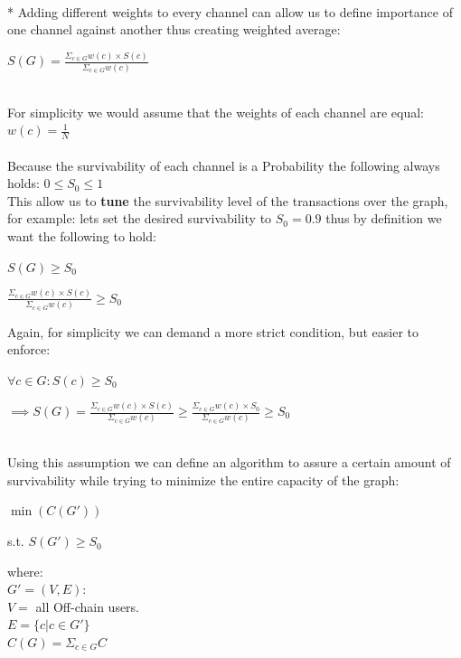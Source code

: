 \documentclass{cup-ino}
\begin{document}
\\
* Adding different weights to every channel can allow us to define importance of one channel against another thus creating weighted average:
\begin{center}
    $S(G) = \frac{\Sigma_{c \in G} w(c) \times S(c)}{\Sigma_{c \in G} w(c)}$
\end{center}
\\
For simplicity we would assume that the weights of each channel are equal: $w(c) = \frac{1}{N}$
\\\\
Because the survivability of each channel is a Probability the following always holds: $0 \leq S_0 \leq 1$\\
This allow us to \textbf{tune} the survivability level of the transactions over the graph, for example: lets set the desired survivability to $S_0 = 0.9$ thus by definition we want the following to hold:
\begin{center}
$S(G) \geq S_0$

$\frac{\Sigma_{c \in G} w(c) \times S(c)}{\Sigma_{c \in G} w(c)} \geq S_0$
\end{center}

Again, for simplicity we can demand a more strict condition, but easier to enforce:
\begin{center}
$\forall c \in G: S(c) \geq S_0$

$\implies S(G) = \frac{\Sigma_{c \in G} w(c) \times S(c)}{\Sigma_{c \in G} w(c)} \geq \frac{\Sigma_{c \in G} w(c) \times S_0}{\Sigma_{c \in G} w(c)} \geq S_0$
\end{center}
\\
Using this assumption we can define an algorithm to assure a certain amount of survivability  while trying to minimize the entire capacity of the graph:

\begin{center}
    $\min(C(G'))$ 

    s.t. $S(G') \geq S_0$
\end{center}
where:\\
$G'=(V,E) :$\\
$V = $ all Off-chain users.\\
$E = \{c | c \in G'\}$\\
$C(G) = \Sigma_{c \in G} C$\\
\\
\end{document}
